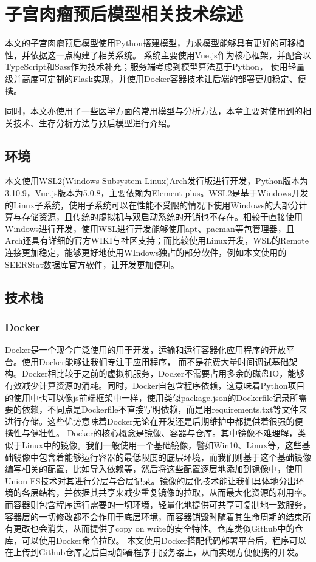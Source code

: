 \chapter{子宫肉瘤预后模型相关技术综述}
\label{chap:env} 

本文的子宫肉瘤预后模型使用Python搭建模型，力求模型能够具有更好的可移植性，并依据这一点构建了相关系统。
系统主要使用Vue.js作为核心框架，并配合以TypeScript和Sass作为技术补充；服务端考虑到模型算法基于Python，
使用轻量级并高度可定制的Flask实现，并使用Docker容器技术让后端的部署更加稳定、便携。

同时，本文亦使用了一些医学方面的常用模型与分析方法，本章主要对使用到的相关技术、生存分析方法与预后模型进行介绍。

\section{环境}

本文使用WSL2(Windows Subsystem Linux)Arch发行版进行开发，Python版本为3.10.9，Vue.js版本为5.0.8，主要依赖为Element-plus。WSL2是基于Windows开发的Linux子系统，使用子系统可以在性能不受限的情况下使用Windows的大部分计算与存储资源，且传统的虚拟机与双启动系统的开销也不存在。相较于直接使用Windows进行开发，使用WSL进行开发能够使用apt、pacman等包管理器，且Arch还具有详细的官方WIKI与社区支持；而比较使用Linux开发，WSL的Remote连接更加稳定，能够更好地使用WIndows独占的部分软件，例如本文使用的SEERStat数据库官方软件，让开发更加便利。

\section{技术栈}

\subsection{Docker}

Docker是一个现今广泛使用的用于开发，运输和运行容器化应用程序的开放平台。使用Docker能够让我们专注于应用程序，
而不是花费大量时间调试基础架构。Docker相比较于之前的虚拟机服务，Docker不需要占用多余的磁盘IO，能够有效减少计算资源的消耗。同时，Docker自包含程序依赖，这意味着Python项目的使用中也可以像js前端框架中一样，使用类似package.json的Dockerfile记录所需要的依赖，不同点是Dockerfile不直接写明依赖，而是用requirements.txt等文件来进行存储。这些优势意味着Docker无论在开发还是后期维护中都提供着很强的便携性与健壮性。
Docker的核心概念是镜像、容器与仓库。其中镜像不难理解，类似于Linux中的镜像。我们一般使用一个基础镜像，譬如Win10、Linux等，这些基础镜像中包含着能够运行容器的最低限度的底层环境，而我们则基于这个基础镜像编写相关的配置，比如导入依赖等，然后将这些配置逐层地添加到镜像中，使用Union FS技术对其进行分层与合层记录。镜像的层化技术能让我们具体地分出环境的各层结构，并依据其共享来减少重复镜像的拉取，从而最大化资源的利用率。而容器则包含程序运行需要的一切环境，轻量化地提供可共享可复制地一致服务，容器层的一切修改都不会作用于底层环境，而容器销毁时随着其生命周期的结束所有更改也会消失，从而提供了copy on write的安全特性。仓库类似Github中的仓库，可以使用Docker命令拉取。
本文使用Docker搭配代码部署平台后，程序可以在上传到Github仓库之后自动部署程序于服务器上，从而实现方便便携的开发。


